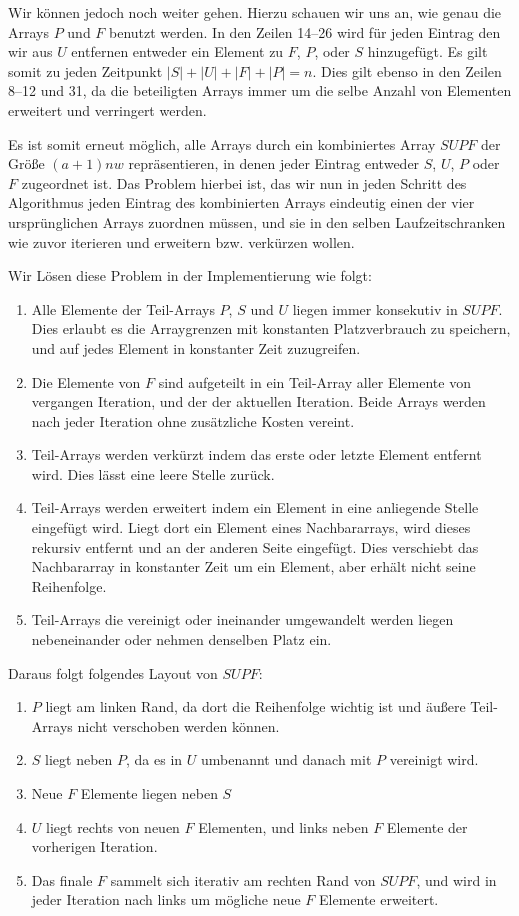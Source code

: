 Wir können jedoch noch weiter gehen. Hierzu schauen wir uns an, wie genau die Arrays $P$ und $F$ benutzt werden. In den Zeilen 14--26 wird für jeden Eintrag den wir aus $U$ entfernen entweder ein Element zu $F$, $P$, oder $S$ hinzugefügt. Es gilt somit zu jeden Zeitpunkt $|S| + |U| + |F| + |P| = n$. Dies gilt ebenso in den Zeilen 8--12 und 31, da die beteiligten Arrays immer um die selbe Anzahl von Elementen erweitert und verringert werden.

Es ist somit erneut möglich, alle Arrays durch ein kombiniertes Array $SUPF$ der Größe $(a + 1)nw$ repräsentieren, in denen jeder Eintrag entweder $S$, $U$, $P$ oder $F$ zugeordnet ist. Das Problem hierbei ist, das wir nun in jeden Schritt des Algorithmus jeden Eintrag des kombinierten Arrays eindeutig einen der vier ursprünglichen Arrays zuordnen müssen, und sie in den selben Laufzeitschranken wie zuvor iterieren und erweitern bzw. verkürzen wollen.

Wir Lösen diese Problem in der Implementierung wie folgt:

\begin{enumerate}
\item Alle Elemente der Teil-Arrays $P$, $S$ und $U$ liegen immer konsekutiv in $SUPF$. Dies erlaubt es die Arraygrenzen mit konstanten Platzverbrauch zu speichern, und auf jedes Element in konstanter Zeit zuzugreifen.
\item Die Elemente von $F$ sind aufgeteilt in ein Teil-Array aller Elemente von vergangen Iteration, und der der aktuellen Iteration. Beide Arrays werden nach jeder Iteration ohne zusätzliche Kosten vereint.
\item Teil-Arrays werden verkürzt indem das erste oder letzte Element entfernt wird. Dies lässt eine leere Stelle zurück.
\item Teil-Arrays werden erweitert indem ein Element in eine anliegende Stelle eingefügt wird. Liegt dort ein Element eines Nachbararrays, wird dieses rekursiv entfernt und an der anderen Seite eingefügt. Dies verschiebt das Nachbararray in konstanter Zeit um ein Element, aber erhält nicht seine Reihenfolge.
\item Teil-Arrays die vereinigt oder ineinander umgewandelt werden liegen nebeneinander oder nehmen denselben Platz ein.
\end{enumerate}

Daraus folgt folgendes Layout von $SUPF$:

\begin{enumerate}
\item $P$ liegt am linken Rand, da dort die Reihenfolge wichtig ist und äußere Teil-Arrays nicht verschoben werden können.
\item $S$ liegt neben $P$, da es in $U$ umbenannt und danach mit $P$ vereinigt wird.
\item Neue $F$ Elemente liegen neben $S$
\item $U$ liegt rechts von neuen $F$ Elementen, und links neben $F$ Elemente der vorherigen Iteration.
\item Das finale $F$ sammelt sich iterativ am rechten Rand von $SUPF$, und wird in jeder Iteration nach links um mögliche neue $F$ Elemente erweitert.
\end{enumerate}

